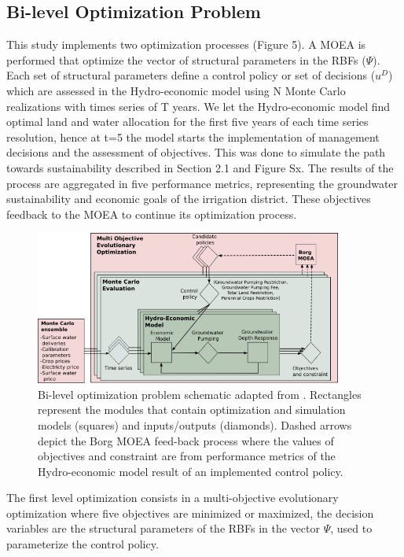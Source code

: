 \documentclass[11pt,a4paper]{article}
\begin{document}
\subsection{Bi-level Optimization Problem}

This study implements two optimization processes (Figure 5). A MOEA is performed that optimize the vector of structural parameters in the RBFs ($\Psi$). Each set of structural parameters define a control policy or set of decisions ($u^{D}$) which are assessed in the Hydro-economic model using N Monte Carlo realizations with times series of T years. We let the Hydro-economic model find optimal land and water allocation for the first five years of each time series resolution, hence at t=5 the model starts the implementation of management decisions and the assessment of objectives. This was done to simulate the path towards sustainability described in Section 2.1 and Figure Sx. The results of the  process are aggregated in five performance metrics, representing the groundwater sustainability and economic goals of the irrigation district. These objectives feedback to the MOEA to continue its optimization process. 

\begin{figure}[H]
    \centering
    \includegraphics[width=0.9\textwidth]{Diagram2}
    \caption{Bi-level optimization problem schematic adapted from \textcite{hamilton_stream_2022}. Rectangles represent the modules that contain optimization and simulation models (squares) and inputs/outputs (diamonds). Dashed arrows depict the Borg MOEA feed-back process where the values of objectives and constraint are from performance metrics of the Hydro-economic model result of an implemented control policy.}
    \label{fig:m1esh1}
\end{figure}

The first level optimization consists in a multi-objective evolutionary optimization where five objectives are minimized or maximized, the decision variables are the structural parameters of the RBFs in the vector $\Psi$, used to parameterize the control policy. 
\end{document}
